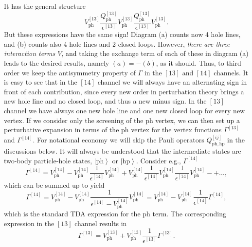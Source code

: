 \documentclass[twoside,12pt]{article}
\begin{document}
It has the general structure
\[
            V_{\mathrm{ph}}^{[13]}
            \frac{Q_{\mathrm{ph}}^{[13]}}{\epsilon^{[13]}}
             V_{\mathrm{ph}}^{[13]}
            \frac{Q_{\mathrm{ph}}^{[13]}}{\epsilon^{[13]}}
            V_{\mathrm{ph}}^{[13]}.
\]
But these expressions have the same sign! Diagram (a) counts
now 4 hole lines, and (b) counts also 4 hole lines and 2 closed
loops. However, {\em there are three interaction terms $V$},
and taking
the exchange term of each of these in diagram (a) leads to
the desired results, namely $(a)=-(b)$, as it should.
Thus, to third order we keep the antisymmetry property of
$\Gamma$ in the $[13]$ and $[14]$ channels.
It is easy to see that in the $[14]$ channel we will always
have an alternating sign in front of each contribution,
since every new order in perturbation theory brings a new hole
line and no closed loop, and thus a new minus sign.
In the $[13]$ channel we have always one new hole line and
one new closed loop for every new vertex.
If we consider only the screening of the ph vertex, we can then set up
a perturbative expansion in terms of the ph vertex for the
vertex functions $\Gamma^{[13]}$ and $\Gamma^{[14]}$.
For notational economy we will skip the Pauli operators
$Q_{\mathrm{ph,hp}}^{[ij]}$ in the discussions below.
It will always be understood that the intermediate states
are two-body particle-hole states, $\left| \mathrm{ph}\right\rangle$ or
$\left| \mathrm{hp}\right\rangle$.
Consider e.g.,
$\Gamma^{[14]}$
\begin{equation}
       \Gamma^{[14]}=V^{[14]}_{\mathrm{ph}}-
        V^{[14]}_{\mathrm{ph}}
        \frac{1}{\epsilon^{[14]}}
        V_{\mathrm{ph}}^{[14]}+
        V^{[14]}_{\mathrm{ph}}
        \frac{1}{\epsilon^{[14]}}
        V^{[14]}_{\mathrm{ph}}
        \frac{1}{\epsilon^{[14]}}
        V^{[14]}_{\mathrm{ph}}-+\dots,
\end{equation}
which can be summed up to yield
\begin{equation}
  \Gamma^{[14]}=V^{[14]}_{\mathrm{ph}}-
   V^{[14]}_{\mathrm{ph}}
   \frac{1}
   {\epsilon^{[14]}-V^{[14]}_{\mathrm{ph}}}
   V^{[14]}_{\mathrm{ph}}=
   V^{[14]}_{\mathrm{ph}}-
   V^{[14]}_{\mathrm{ph}}
   \frac{1}{\epsilon^{[14]}}\Gamma^{[14]},
   \label{eq:screening1}
\end{equation}
which is the standard TDA expression for the ph term.
The corresponding expression in the $[13]$ channel
results in
\begin{equation}
  \Gamma^{[13]}=V^{[13]}_{\mathrm{ph}}+
   V^{[13]}_{\mathrm{ph}}
   \frac{1}{\epsilon^{[13]}}\Gamma^{[13]}.
\end{equation}
\end{document}
